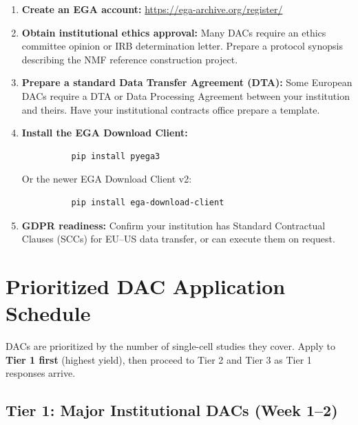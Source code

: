 \documentclass[11pt,letterpaper]{article}
\begin{document}
\begin{enumerate}[nosep]
    \item \textbf{Create an EGA account:}
          \url{https://ega-archive.org/register/}

    \item \textbf{Obtain institutional ethics approval:}
          Many DACs require an ethics committee opinion or IRB
          determination letter. Prepare a protocol synopsis describing
          the NMF reference construction project.

    \item \textbf{Prepare a standard Data Transfer Agreement (DTA):}
          Some European DACs require a DTA or Data Processing Agreement
          between your institution and theirs. Have your institutional
          contracts office prepare a template.

    \item \textbf{Install the EGA Download Client:}
          \begin{verbatim}
          pip install pyega3
          \end{verbatim}
          Or the newer EGA Download Client v2:
          \begin{verbatim}
          pip install ega-download-client
          \end{verbatim}

    \item \textbf{GDPR readiness:} Confirm your institution has
          Standard Contractual Clauses (SCCs) for EU--US data transfer,
          or can execute them on request.
\end{enumerate}

\section{Prioritized DAC Application Schedule}

DACs are prioritized by the number of single-cell studies they cover.
Apply to \textbf{Tier 1 first} (highest yield), then proceed to
Tier 2 and Tier 3 as Tier 1 responses arrive.

\subsection{Tier 1: Major Institutional DACs (Week 1--2)}
\end{document}
